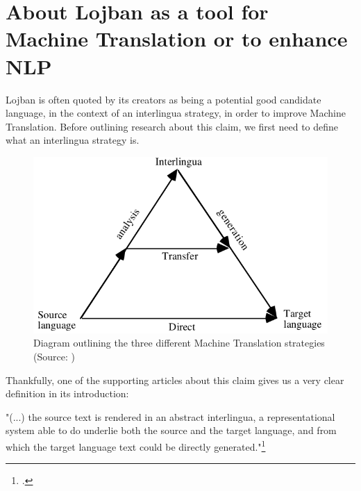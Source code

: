 





\newpage

\section{About Lojban as a tool for Machine Translation or to enhance NLP}

Lojban is often quoted by its creators as being a potential good candidate language, in the context of an interlingua strategy, in order to improve
Machine Translation. Before outlining research about this claim, we first need to define what an interlingua strategy is.\newline

\begin{figure}[H]
\centering
\includegraphics[scale=0.45]{images/interlingua.png}
\caption{Diagram outlining the three different Machine Translation strategies (Source: \cite{nicholas1996lojban})}
\end{figure}

Thankfully, one of the supporting articles about this claim gives us a very clear definition in its introduction:\newline

"(...) the source text is rendered in an abstract interlingua, a representational system able to do underlie both the source and the target
language, and from which the target language text could be directly generated."\footcite{nicholas1996lojban} \newline


